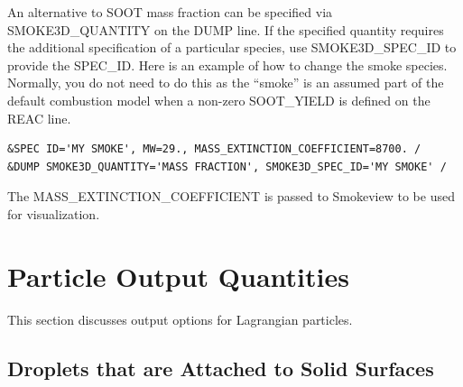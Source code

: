 \documentclass[11pt]{book}
\begin{document}
An alternative to {\ct SOOT} mass fraction can be specified via {\ct SMOKE3D\_QUANTITY} on the {\ct DUMP} line. If the specified quantity requires the additional specification of a particular species, use {\ct SMOKE3D\_SPEC\_ID} to provide the {\ct SPEC\_ID}. Here is an example of how to change the smoke species. Normally, you do not need to do this as the ``smoke'' is an assumed part of the default combustion model when a non-zero {\ct SOOT\_YIELD} is defined on the {\ct REAC} line.
\begin{lstlisting}
&SPEC ID='MY SMOKE', MW=29., MASS_EXTINCTION_COEFFICIENT=8700. /
&DUMP SMOKE3D_QUANTITY='MASS FRACTION', SMOKE3D_SPEC_ID='MY SMOKE' /
\end{lstlisting}
The {\ct MASS\_EXTINCTION\_COEFFICIENT} is passed to Smokeview to be used for visualization.



\section{Particle Output Quantities}
\label{info:part_output}

This section discusses output options for Lagrangian particles.

\subsection{Droplets that are Attached to Solid Surfaces}
\end{document}
